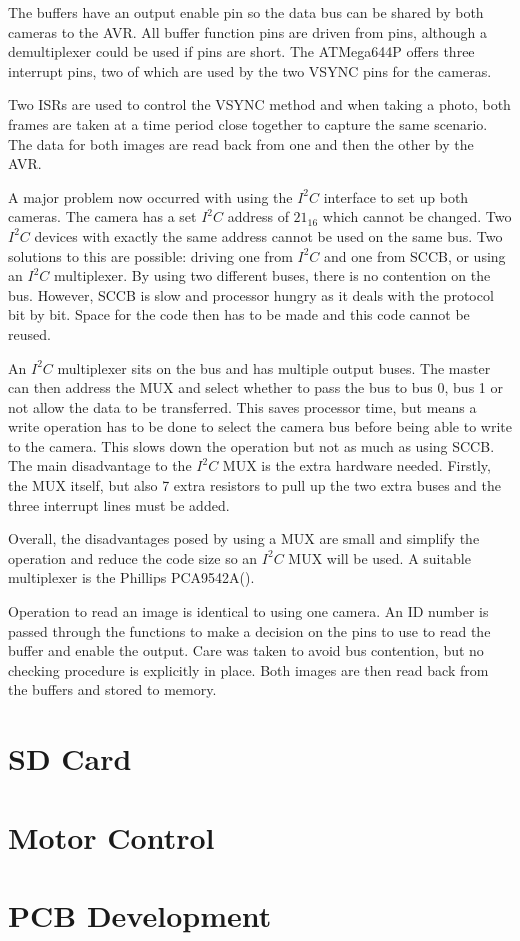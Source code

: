 The buffers have an output enable pin so the data bus can be shared by both cameras to the AVR. All buffer function pins are driven from pins, although a demultiplexer could be used if pins are short. The ATMega644P offers three interrupt pins, two of which are used by the two VSYNC pins for the cameras.

Two ISRs are used to control the VSYNC method and when taking a photo, both frames are taken at a time period close together to capture the same scenario. The data for both images are read back from one and then the other by the AVR. 

A major problem now occurred with using the $I^{2}C$ interface to set up both cameras. The camera has a set $I^{2}C$ address of $21_{16}$ which cannot be changed. Two $I^{2}C$ devices with exactly the same address cannot be used on the same bus. 
Two solutions to this are possible: driving one from $I^{2}C$ and one from SCCB, or using an $I^{2}C$ multiplexer. By using two different buses, there is no contention on the bus. However, SCCB is slow and processor hungry as it deals with the protocol bit by bit. Space for the code then has to be made and this code cannot be reused. 

An $I^{2}C$ multiplexer sits on the bus and has multiple output buses. The master can then address the MUX and select whether to pass the bus to bus 0, bus 1 or not allow the data to be transferred. This saves processor time, but means a write operation has to be done to select the camera bus before being able to write to the camera. This slows down the operation but not as much as using SCCB. The main disadvantage to the $I^{2}C$ MUX is the extra hardware needed. Firstly, the MUX itself, but also 7 extra resistors to pull up the two extra buses and the three interrupt lines must be added. 

Overall, the disadvantages posed by using a MUX are small and simplify the operation and reduce the code size so an $I^{2}C$ MUX will be used. A suitable multiplexer is the Phillips PCA9542A(\cite{I2C_Mux}).

Operation to read an image is identical to using one camera. An ID number is passed through the functions to make a decision on the pins to use to read the buffer and enable the output. Care was taken to avoid bus contention, but no checking procedure is explicitly in place. Both images are then read back from the buffers and stored to memory. 

\section{SD Card} 

\section{Motor Control}

\section{PCB Development}